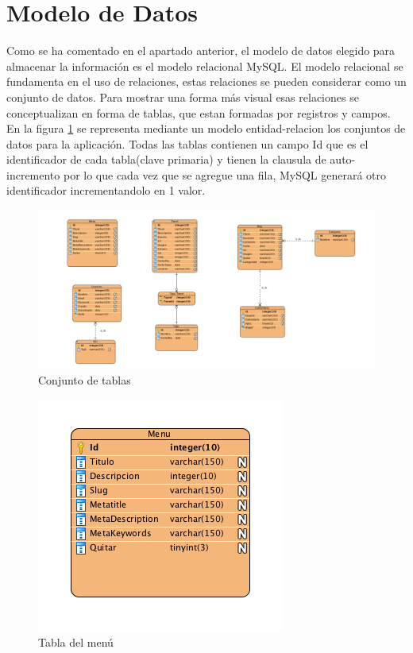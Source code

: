 \section{Modelo de Datos}

Como se ha comentado en el apartado anterior, el modelo de datos elegido para almacenar la información es el modelo relacional MySQL. El modelo relacional se fundamenta en el uso de relaciones, estas relaciones se pueden considerar como un conjunto de datos. Para mostrar una forma más visual esas relaciones se conceptualizan en forma de tablas, que estan formadas por registros y campos. En la figura \ref{tablas_bd} se representa mediante un modelo entidad-relacion los conjuntos de datos para la aplicación. Todas las tablas contienen un campo Id que es el identificador de cada tabla(clave primaria) y tienen la clausula de auto-incremento por lo que cada vez que se agregue una fila, MySQL generará otro identificador incrementandolo en 1 valor.


\begin{figure}
\begin{center}
\includegraphics[width=1.0\textwidth]{imagenes/E-R.png}
\caption{Conjunto de tablas}
\label{tablas_bd}
\end{center}
\end{figure}

\begin{figure}
\begin{center}
\includegraphics[scale=0.7]{imagenes/menu.png}
\caption{Tabla del menú}
\label{menu_bd}
\end{center}
\end{figure}

